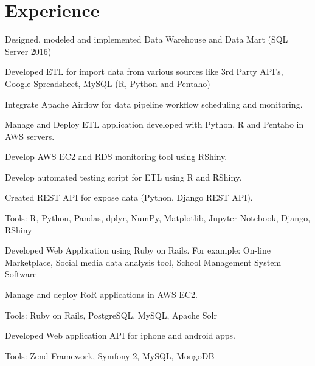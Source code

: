 \documentclass[]{deedy-resume-openfont}
\begin{document}
\begin{minipage}[t]{0.66\textwidth} 


\section{Experience}

\vspace{\topsep} %
\begin{tightemize}
\item Designed, modeled and implemented Data Warehouse and Data Mart (SQL Server 2016)
\item Developed ETL for import data from various sources like 3rd Party API's, Google Spreadsheet, MySQL (R, Python and Pentaho)
\item Integrate Apache Airflow for data pipeline workflow scheduling and monitoring.
\item Manage and Deploy ETL application developed with Python, R and Pentaho in AWS servers.
\item Develop AWS EC2 and RDS monitoring tool using RShiny.
\item Develop automated testing script for ETL using R and RShiny.
\item Created REST API for expose data (Python, Django REST API).
\item Tools: R, Python, Pandas, dplyr, NumPy, Matplotlib, Jupyter Notebook, Django, RShiny
\end{tightemize}
\sectionsep

\begin{tightemize}
\item Developed Web Application using Ruby on Rails. For example: On-line Marketplace, Social media data analysis tool, School Management System Software
\item Manage and deploy RoR applications in AWS EC2.
\item Tools: Ruby on Rails, PostgreSQL, MySQL, Apache Solr
\end{tightemize}
\sectionsep

\begin{tightemize}
\item Developed Web application API for iphone and android apps.
\item Tools: Zend Framework, Symfony 2, MySQL, MongoDB
\end{tightemize}
\sectionsep


\end{minipage}
\end{document}
